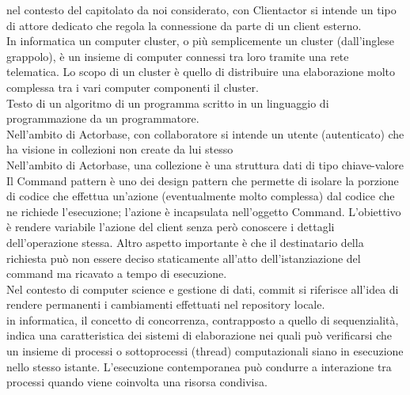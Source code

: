 \documentclass{scalatekids-article}
\begin{document}
 nel contesto del capitolato da noi considerato, con Clientactor si intende un tipo di attore dedicato che regola la connessione da parte di un client esterno. 
\\

 In informatica un computer cluster, o più semplicemente un cluster (dall'inglese grappolo), è un insieme di computer connessi tra loro tramite una rete telematica. Lo scopo di un cluster è quello di distribuire una elaborazione molto complessa tra i vari computer componenti il cluster. 
\\

 Testo di un algoritmo di un programma scritto in un linguaggio di programmazione da un programmatore.
\\

 Nell'ambito di Actorbase, con collaboratore si intende un utente (autenticato) che ha visione in collezioni non create da lui stesso
\\

 Nell'ambito di Actorbase, una collezione è una struttura dati di tipo chiave-valore
\\

 Il Command pattern è uno dei design pattern che permette di isolare la porzione di codice che effettua un'azione (eventualmente molto complessa) dal codice che ne richiede l'esecuzione; l'azione è incapsulata nell'oggetto Command.
L'obiettivo è rendere variabile l'azione del client senza però conoscere i dettagli dell'operazione stessa. Altro aspetto importante è che il destinatario della richiesta può non essere deciso staticamente all'atto dell'istanziazione del command ma ricavato a tempo di esecuzione.
\\

 Nel contesto di computer science e gestione di dati, commit si riferisce all'idea di rendere permanenti i cambiamenti effettuati nel repository locale.
\\

 in informatica, il concetto di concorrenza, contrapposto a quello di sequenzialità, indica una caratteristica dei sistemi di elaborazione nei quali può verificarsi che un insieme di processi o sottoprocessi (thread) computazionali siano in esecuzione nello stesso istante.
L'esecuzione contemporanea può condurre a interazione tra processi quando viene coinvolta una risorsa condivisa.
\\
\end{document}
